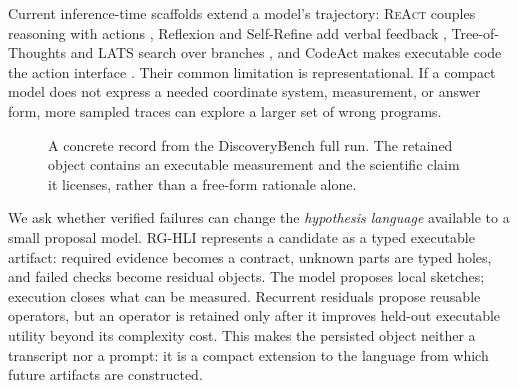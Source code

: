 \documentclass[letterpaper]{article}
\newcommand{\methodshort}{\textsc{RG-HLI}\xspace}
\newcommand{\react}{\textsc{ReAct}\xspace}
\newcommand{\codeact}{CodeAct\xspace}
\begin{document}
Current inference-time scaffolds extend a model's trajectory: \react couples
reasoning with actions \citep{react}, Reflexion and Self-Refine add verbal
feedback \citep{reflexion,selfrefine}, Tree-of-Thoughts and LATS search over
branches \citep{tot,lats}, and \codeact makes executable code the action
interface \citep{codeact}. Their common limitation is representational. If a
compact model does not express a needed coordinate system, measurement, or
answer form, more sampled traces can explore a larger set of wrong programs.

\begin{figure}[t]
\centering
{}
\caption{A concrete record from the DiscoveryBench full run. The retained object contains an executable measurement and the scientific claim it licenses, rather than a free-form rationale alone.}
\label{fig:discovery_case}
\end{figure}

We ask whether verified failures can change the \emph{hypothesis language}
available to a small proposal model. \methodshort represents a candidate as a
typed executable artifact: required evidence becomes a contract, unknown parts
are typed holes, and failed checks become residual objects. The model proposes
local sketches; execution closes what can be measured. Recurrent residuals
propose reusable operators, but an operator is retained only after it improves
held-out executable utility beyond its complexity cost. This makes the
persisted object neither a transcript nor a prompt: it is a compact extension
to the language from which future artifacts are constructed.
\end{document}
